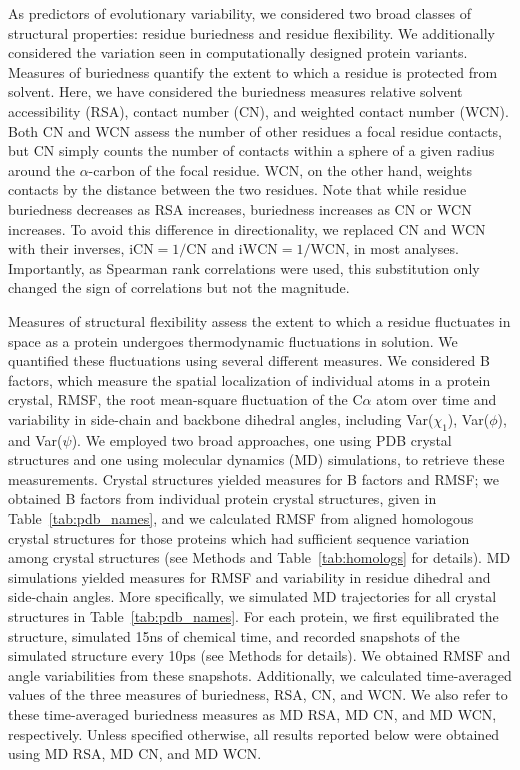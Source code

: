 \documentclass[smallextended]{svjour3}
\begin{document}
As predictors of evolutionary variability, we considered two broad classes of structural properties: residue buriedness and residue flexibility. We additionally considered the variation seen in computationally designed protein variants. Measures of buriedness quantify the extent to which a residue is protected from solvent. Here, we have considered the buriedness measures relative solvent accessibility (RSA), contact number (CN), and weighted contact number (WCN). Both CN and WCN assess the number of other residues a focal residue contacts, but CN simply counts the number of contacts within a sphere of a given radius around the $\alpha$-carbon of the focal residue. WCN, on the other hand, weights contacts by the distance between the two residues. Note that while residue buriedness decreases as RSA increases, buriedness increases as CN or WCN increases. To avoid this difference in directionality, we replaced CN and WCN with their inverses, $\text{iCN}=1/\text{CN}$ and $\text{iWCN}=1/\text{WCN}$, in most analyses. Importantly, as Spearman rank correlations were used, this substitution only changed the sign of correlations but not the magnitude.

Measures of structural flexibility assess the extent to which a residue fluctuates in space as a protein undergoes thermodynamic fluctuations in solution. We quantified these fluctuations using several different measures. We considered B factors, which measure the spatial localization of individual atoms in a protein crystal, RMSF, the root mean-square fluctuation of the C$\alpha$ atom over time and variability in side-chain and backbone dihedral angles, including Var($\chi_1$), Var($\phi$), and Var($\psi$). We employed two broad approaches, one using PDB crystal structures and one using molecular dynamics (MD) simulations, to retrieve these measurements. Crystal structures yielded measures for B factors and RMSF; we obtained B factors from individual protein crystal structures, given in Table~\ref{tab:pdb_names}, and we calculated RMSF from aligned homologous crystal structures for those proteins which had sufficient sequence variation among crystal structures (see Methods and Table~\ref{tab:homologs} for details). MD simulations yielded measures for RMSF and variability in residue dihedral and side-chain angles. More specifically, we simulated MD trajectories for all crystal structures in Table~\ref{tab:pdb_names}. For each protein, we first equilibrated the structure, simulated 15ns of chemical time, and recorded snapshots of the simulated structure every 10ps (see Methods for details). We obtained RMSF and angle variabilities from these snapshots. Additionally, we calculated time-averaged values of the three measures of buriedness, RSA, CN, and WCN. We also refer to these time-averaged buriedness measures as MD RSA, MD CN, and MD WCN, respectively. Unless specified otherwise, all results reported below were obtained using MD RSA, MD CN, and MD WCN.
\end{document}
